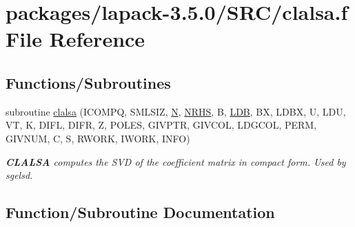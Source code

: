 \hypertarget{clalsa_8f}{}\section{packages/lapack-\/3.5.0/\+S\+R\+C/clalsa.f File Reference}
\label{clalsa_8f}
\subsection*{Functions/\+Subroutines}
\begin{DoxyCompactItemize}
\item 
subroutine \hyperlink{clalsa_8f_afba920049d8d99f99e48e408ce1e2591}{clalsa} (I\+C\+O\+M\+P\+Q, S\+M\+L\+S\+I\+Z, \hyperlink{polmisc_8c_a0240ac851181b84ac374872dc5434ee4}{N}, \hyperlink{example__user_8c_aa0138da002ce2a90360df2f521eb3198}{N\+R\+H\+S}, B, \hyperlink{example__user_8c_a50e90a7104df172b5a89a06c47fcca04}{L\+D\+B}, B\+X, L\+D\+B\+X, U, L\+D\+U, V\+T, K, D\+I\+F\+L, D\+I\+F\+R, Z, P\+O\+L\+E\+S, G\+I\+V\+P\+T\+R, G\+I\+V\+C\+O\+L, L\+D\+G\+C\+O\+L, P\+E\+R\+M, G\+I\+V\+N\+U\+M, C, S, R\+W\+O\+R\+K, I\+W\+O\+R\+K, I\+N\+F\+O)
\begin{DoxyCompactList}\small\item\em {\bfseries C\+L\+A\+L\+S\+A} computes the S\+V\+D of the coefficient matrix in compact form. Used by sgelsd. \end{DoxyCompactList}\end{DoxyCompactItemize}


\subsection{Function/\+Subroutine Documentation}
\hypertarget{clalsa_8f_afba920049d8d99f99e48e408ce1e2591}{}
